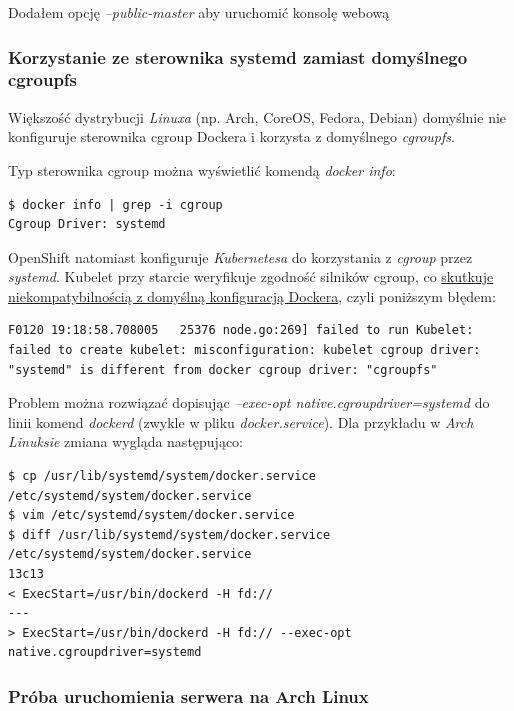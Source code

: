 \documentclass[a4paper,12pt,twoside,openany]{report}
\begin{document}
Dodałem opcję \emph{--public-master} aby uruchomić konsolę webową

\hypertarget{korzystanie-ze-sterownika-systemd-zamiast-domyux15blnego-cgroupfs}{%
\subsubsection{Korzystanie ze sterownika systemd zamiast domyślnego
cgroupfs}\label{korzystanie-ze-sterownika-systemd-zamiast-domyux15blnego-cgroupfs}}

Większość dystrybucji \emph{Linuxa} (np. Arch, CoreOS, Fedora, Debian)
domyślnie nie konfiguruje sterownika cgroup Dockera i korzysta z
domyślnego \emph{cgroupfs}.

Typ sterownika cgroup można wyświetlić komendą \emph{docker info}:

\begin{lstlisting}
$ docker info | grep -i cgroup
Cgroup Driver: systemd
\end{lstlisting}

OpenShift natomiast konfiguruje \emph{Kubernetesa} do korzystania z
\emph{cgroup} przez \emph{systemd}. Kubelet przy starcie weryfikuje
zgodność silników cgroup, co
\href{https://github.com/openshift/origin/issues/14766}{skutkuje
niekompatybilnością z domyślną konfiguracją Dockera}, czyli poniższym
błędem:

\begin{lstlisting}
F0120 19:18:58.708005   25376 node.go:269] failed to run Kubelet: failed to create kubelet: misconfiguration: kubelet cgroup driver: "systemd" is different from docker cgroup driver: "cgroupfs"
\end{lstlisting}

Problem można rozwiązać dopisując \emph{--exec-opt
native.cgroupdriver=systemd} do linii komend \emph{dockerd} (zwykle w
pliku \emph{docker.service}). Dla przykładu w \emph{Arch Linuksie}
zmiana wygląda następująco:

\begin{lstlisting}
$ cp /usr/lib/systemd/system/docker.service /etc/systemd/system/docker.service
$ vim /etc/systemd/system/docker.service
$ diff /usr/lib/systemd/system/docker.service /etc/systemd/system/docker.service
13c13
< ExecStart=/usr/bin/dockerd -H fd://
---
> ExecStart=/usr/bin/dockerd -H fd:// --exec-opt native.cgroupdriver=systemd
\end{lstlisting}

\hypertarget{pruxf3ba-uruchomienia-serwera-na-arch-linux}{%
\subsubsection{Próba uruchomienia serwera na Arch
Linux}\label{pruxf3ba-uruchomienia-serwera-na-arch-linux}}
\end{document}

